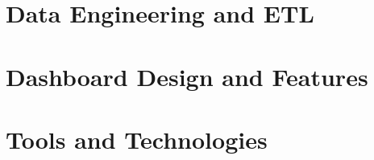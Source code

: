 \section{Data Engineering and ETL}

\section{Dashboard Design and Features}

\section{Tools and Technologies}
